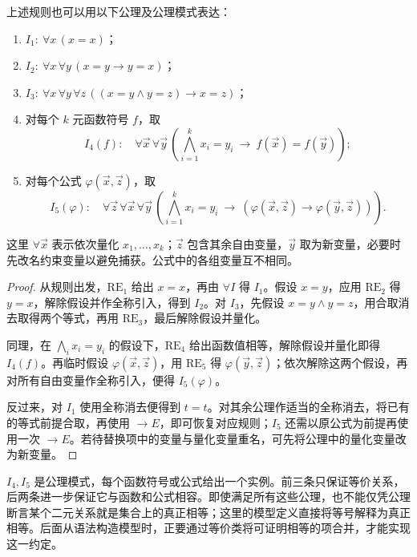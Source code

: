 \documentclass[lang=cn,a4paper,fontset=none,zihao=false,10pt,openany,twoside]{beautybook}
\numberwithin{algorithm}{chapter}
\begin{document}
\begin{proposition}[等号公理与等号规则]\label{prop:equality-axioms}
上述规则也可以用以下公理及公理模式表达：
\begin{enumerate}[(1)]
\item $I_1:\ \forall x\,(x=x)$；
\item $I_2:\ \forall x\,\forall y\,(x=y\to y=x)$；
\item $I_3:\ \forall x\,\forall y\,\forall z\,((x=y\wedge y=z)\to x=z)$；
\item 对每个 $k$ 元函数符号 $f$，取
\[
 I_4(f):\quad
 \forall\vec x\,\forall\vec y\,
 \left(\bigwedge_{i=1}^k x_i=y_i\ \to\ f(\vec x)=f(\vec y)\right);
\]
\item 对每个公式 $\varphi(\vec x,\vec z)$，取
\[
 I_5(\varphi):\quad
 \forall\vec z\,\forall\vec x\,\forall\vec y\,
 \left(\bigwedge_{i=1}^k x_i=y_i\ \to\
       (\varphi(\vec x,\vec z)\to\varphi(\vec y,\vec z))\right).
\]
\end{enumerate}
这里 $\forall\vec x$ 表示依次量化 $x_1,\ldots,x_k$；$\vec z$ 包含其余自由变量，$\vec y$ 取为新变量，必要时先改名约束变量以避免捕获。公式中的各组变量互不相同。
\end{proposition}
\begin{proof}
从规则出发，$\mathrm{RE}_1$ 给出 $x=x$，再由 $\forall I$ 得 $I_1$。假设 $x=y$，应用 $\mathrm{RE}_2$ 得 $y=x$，解除假设并作全称引入，得到 $I_2$。对 $I_3$，先假设 $x=y\wedge y=z$，用合取消去取得两个等式，再用 $\mathrm{RE}_3$，最后解除假设并量化。

同理，在 $\bigwedge_i x_i=y_i$ 的假设下，$\mathrm{RE}_4$ 给出函数值相等，解除假设并量化即得 $I_4(f)$。再临时假设 $\varphi(\vec x,\vec z)$，用 $\mathrm{RE}_5$ 得 $\varphi(\vec y,\vec z)$；依次解除这两个假设，再对所有自由变量作全称引入，便得 $I_5(\varphi)$。

反过来，对 $I_1$ 使用全称消去便得到 $t=t$。对其余公理作适当的全称消去，将已有的等式前提合取，再使用 $\to E$，即可恢复对应规则；$I_5$ 还需以原公式为前提再使用一次 $\to E$。若待替换项中的变量与量化变量重名，可先将公理中的量化变量改为新变量。
\end{proof}

\begin{remark}
$I_4,I_5$ 是公理模式，每个函数符号或公式给出一个实例。前三条只保证等价关系，后两条进一步保证它与函数和公式相容。即使满足所有这些公理，也不能仅凭公理断言某个二元关系就是集合上的真正相等；这里的模型定义直接将等号解释为真正相等。后面从语法构造模型时，正要通过等价类将可证明相等的项合并，才能实现这一约定。
\end{remark}
\end{document}
